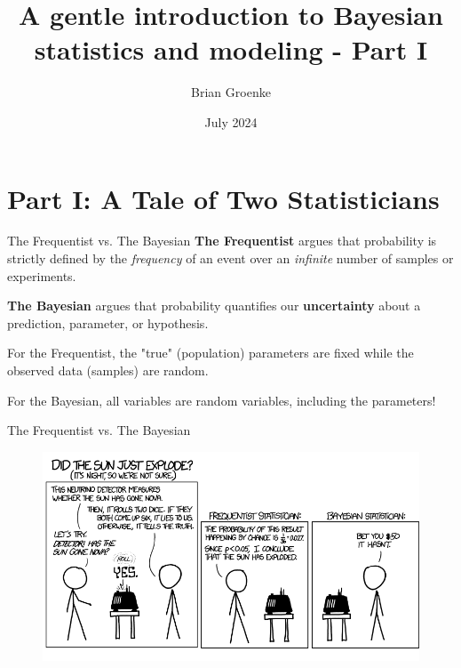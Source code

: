 \documentclass[12pt,aspectratio=169]{beamer}
\title{A gentle introduction to Bayesian statistics and modeling - Part I}
\author{Brian Groenke}
\date{July 2024}
\begin{document}
\maketitle
\addtocounter{framenumber}{-1}


\section{Part I: A Tale of Two Statisticians}
\begin{frame}{The Frequentist vs. The Bayesian}
    \textbf{The Frequentist} argues that probability is strictly defined by the \textit{frequency} of an event over an \textit{infinite} number of samples or experiments.
    \pause\newline
    
    \textbf{The Bayesian} argues that probability quantifies our \textbf{uncertainty} about a prediction, parameter, or hypothesis.
    \pause\newline
    
    For the Frequentist, the "true" (population) parameters are fixed while the observed data (samples) are random.
    \pause\newline
    
    For the Bayesian, all variables are random variables, including the parameters!
\end{frame}  

\begin{frame}{The Frequentist vs. The Bayesian}
    \begin{figure}
        \centering
        \includegraphics[scale=0.44]{figs/frequentists_vs_bayesians_landscape.png}
    \end{figure}
\end{frame}
\end{document}
